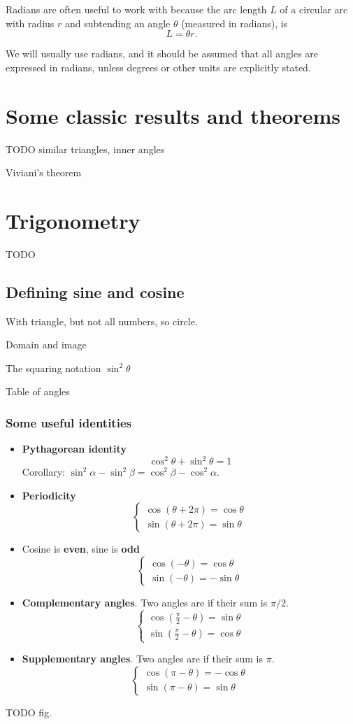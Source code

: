 Radians are often useful to work with because the arc length $L$ of a circular arc with radius $r$ and subtending an angle $\theta$ (measured in radians), is
\[ L = \theta r.\] 

We will usually use radians, and it should be assumed that all angles are expressed in radians, unless degrees or other units are explicitly stated.

\section{Some classic results and theorems}
TODO similar triangles, inner angles

Viviani's theorem

\section{Trigonometry}
TODO
\subsection{Defining sine and cosine}
With triangle, but not all numbers, so circle.

Domain and image

The squaring notation $\sin^2\theta$

Table of angles

\subsubsection{Some useful identities}
\begin{itemize}
\item \textbf{Pythagorean identity}
\[ \cos^2 \theta + \sin^2\theta = 1 \]
Corollary: $\sin^2\alpha - \sin^2\beta = \cos^2\beta - \cos^2\alpha$.
\item \textbf{Periodicity}
\[ \begin{cases}
\cos(\theta + 2\pi) = \cos\theta \\
\sin(\theta + 2\pi) = \sin\theta
\end{cases} \]
\item Cosine is \textbf{even}, sine is \textbf{odd}
\[ \begin{cases}
\cos(-\theta) = \cos\theta \\
\sin(-\theta) = -\sin\theta
\end{cases} \]
\item \textbf{Complementary angles}. Two angles are  if their sum is $\pi/2$.
\[ \begin{cases}
\cos \left(\frac{\pi}{2} - \theta\right) = \sin\theta \\
\sin \left(\frac{\pi}{2} - \theta\right) = \cos\theta
\end{cases} \]
\item \textbf{Supplementary angles}. Two angles are  if their sum is $\pi$.
\[ \begin{cases}
\cos \left(\pi - \theta\right) = -\cos\theta \\
\sin \left(\pi - \theta\right) = \sin\theta
\end{cases} \]
\end{itemize}
TODO fig.
